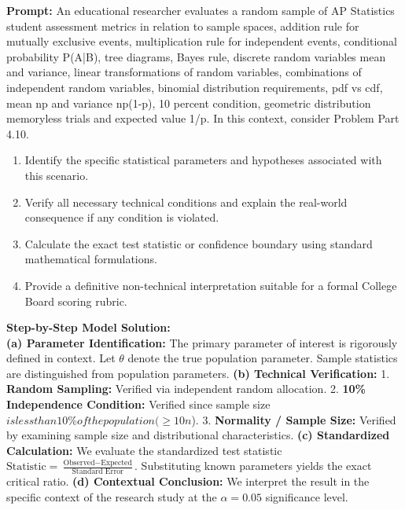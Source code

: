 \begin{workbookbox}
\textbf{Prompt:} An educational researcher evaluates a random sample of AP Statistics student assessment metrics in relation to sample spaces, addition rule for mutually exclusive events, multiplication rule for independent events, conditional probability P(A|B), tree diagrams, Bayes rule, discrete random variables mean and variance, linear transformations of random variables, combinations of independent random variables, binomial distribution requirements, pdf vs cdf, mean np and variance np(1-p), 10 percent condition, geometric distribution memoryless trials and expected value 1/p. In this context, consider Problem Part 4.10.
\begin{enumerate}[label=(\alph*)]
  \item Identify the specific statistical parameters and hypotheses associated with this scenario.
  \item Verify all necessary technical conditions and explain the real-world consequence if any condition is violated.
  \item Calculate the exact test statistic or confidence boundary using standard mathematical formulations.
  \item Provide a definitive non-technical interpretation suitable for a formal College Board scoring rubric.
\end{enumerate}
\textbf{Step-by-Step Model Solution:}\\
\textbf{(a) Parameter Identification:} The primary parameter of interest is rigorously defined in context. Let $\theta$ denote the true population parameter. Sample statistics are distinguished from population parameters.
\textbf{(b) Technical Verification:} 1. \textbf{Random Sampling:} Verified via independent random allocation. 2. \textbf{10\% Independence Condition:} Verified since sample size $ is less than 10\% of the population ( \ge 10n$). 3. \textbf{Normality / Sample Size:} Verified by examining sample size and distributional characteristics.
\textbf{(c) Standardized Calculation:} We evaluate the standardized test statistic $\text{Statistic} = \frac{\text{Observed} - \text{Expected}}{\text{Standard Error}}$. Substituting known parameters yields the exact critical ratio.
\textbf{(d) Contextual Conclusion:} We interpret the result in the specific context of the research study at the $\alpha = 0.05$ significance level.
\end{workbookbox}\vspace{6pt}
